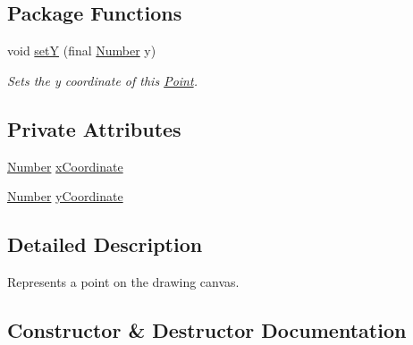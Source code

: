 \subsection*{Package Functions}
\begin{DoxyCompactItemize}
\item 
void \hyperlink{classcom_1_1aarrelaakso_1_1drawl_1_1_point_a713f16e843349993ac2b79bc05b5aeb6}{setY} (final \hyperlink{interfacecom_1_1aarrelaakso_1_1drawl_1_1_number}{Number} y)
\begin{DoxyCompactList}\small\item\em Sets the y coordinate of this \hyperlink{classcom_1_1aarrelaakso_1_1drawl_1_1_point}{Point}. \end{DoxyCompactList}\end{DoxyCompactItemize}
\subsection*{Private Attributes}
\begin{DoxyCompactItemize}
\item 
\hyperlink{interfacecom_1_1aarrelaakso_1_1drawl_1_1_number}{Number} \hyperlink{classcom_1_1aarrelaakso_1_1drawl_1_1_point_aa5144c5cca82c86f845bead6d4a51041}{x\+Coordinate}
\item 
\hyperlink{interfacecom_1_1aarrelaakso_1_1drawl_1_1_number}{Number} \hyperlink{classcom_1_1aarrelaakso_1_1drawl_1_1_point_ab84afea50a66677c32ed2fd3100838c7}{y\+Coordinate}
\end{DoxyCompactItemize}


\subsection{Detailed Description}
Represents a point on the drawing canvas. 

\subsection{Constructor \& Destructor Documentation}
\mbox{\label{classcom_1_1aarrelaakso_1_1drawl_1_1_point_a1eb402d4971df738ea66227c7c12cb70}} 
